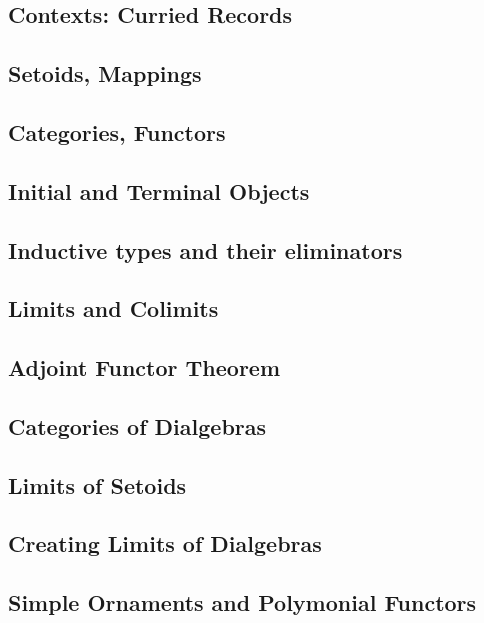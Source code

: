 \documentclass[11pt,oneside]{article}
\begin{document}
\subsection{Contexts: Curried Records}

\subsection{Setoids, Mappings}

\subsection{Categories, Functors}

\subsection{Initial and Terminal Objects}

\subsection{Inductive types and their eliminators}

\subsection{Limits and Colimits}

\subsection{Adjoint Functor Theorem}

\subsection{Categories of Dialgebras}

\subsection{Limits of Setoids}

\subsection{Creating Limits of Dialgebras}

\subsection{Simple Ornaments and Polymonial Functors}
\end{document}
